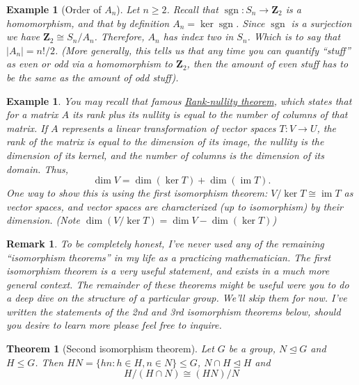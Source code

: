 \documentclass[12pt]{article}
\numberwithin{equation}{subsection}
\newtheorem{thm}[subsection]{Theorem}
\theoremstyle{note}
\newtheorem{example}[subsection]{Example}
\newtheorem{remark}[subsection]{Remark}
\newcommand{\nrml}{\trianglelefteq}
\newcommand{\img}{\operatorname{im}}
\begin{document}
\begin{example}[Order of $A_n$]
	Let $n\geq 2$. Recall that $\operatorname{sgn}\colon S_n\to \mathbf{Z}_2$ is a homomorphism, and that by definition  $A_n=\ker\operatorname{sgn}$. Since $\operatorname{sgn}$ is a surjection we have $\mathbf{Z}_2\cong S_n/A_n$. Therefore, $A_n$ has index two in $S_n$. Which is to say that $|A_n|=n!/2$. (More generally, this tells us that any time you can quantify ``stuff'' as even or odd via a homomorphism to $\mathbf{Z}_2$, then the amount of even stuff has to be the same as the amount of odd stuff). 
\end{example}

\begin{example} You may recall that famous \href{https://en.wikipedia.org/wiki/Rank\%E2\%80\%93nullity_theorem}{\textit{Rank-nullity theorem}}, which states that for a matrix $A$ its rank plus its nullity is equal to the number of columns of that matrix. If $A$ represents a linear transformation of vector spaces $T\colon V\to U$, the rank of the matrix is equal to the dimension of its image, the nullity is the dimension of its kernel, and the number of columns is the dimension of its domain. Thus, \[\dim V=\dim(\ker T)+\dim (\img T).\] One way to show this is using the first isomorphism theorem: $V/\ker T\cong \img T$ as vector spaces, and vector spaces are characterized (up to isomorphism) by their dimension. (Note $\dim (V/\ker T)=\dim V-\dim (\ker T)$)
\end{example} 
{\color{violet}

\begin{remark}	To be completely honest, I've never used any of the remaining ``isomorphism theorems'' in my life as a practicing mathematician. The first isomorphism theorem is a very useful statement, and exists in a much more general context. The remainder of these theorems might be useful were you to do a deep dive on the structure of a particular group. We'll skip them for now. I've written the statements of the 2nd and 3rd isomorphism theorems below, should you desire to learn more please feel free to inquire.
\end{remark}
}
\begin{thm}[Second isomorphism theorem]
Let $G$ be a group, $N\nrml G$ and $H\leq G$. Then $HN=\{hn: h\in H, n\in N\}\leq G$, $N\cap H\nrml H$ and \begin{equation} H/(H\cap N)\cong (HN)/N\end{equation}
\end{thm}
\end{document}

